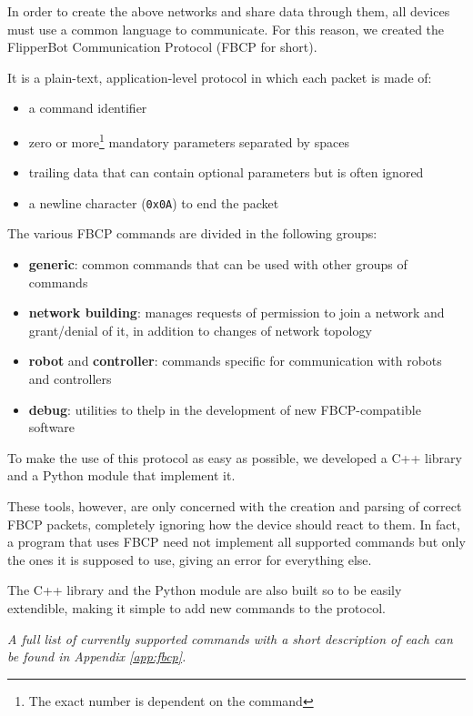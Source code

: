 In order to create the above networks and share data through them,
all devices must use a common language to communicate.
For this reason, we created the FlipperBot Communication Protocol
(FBCP for short).

It is a plain-text, application-level protocol in which each packet
is made of:
\begin{itemize}
  \item a command identifier
  \item zero or more\footnote{The exact number is dependent on the
    command} mandatory parameters separated by spaces
  \item trailing data that can contain optional parameters but is
    often ignored
  \item a newline character (\texttt{0x0A}) to end the packet
\end{itemize}

The various FBCP commands are divided in the following groups:
\begin{itemize}
  \item \textbf{generic}: common commands that can be used with
    other groups of commands
  \item \textbf{network building}: manages requests of permission to
    join a network and grant/denial of it, in addition to changes of
    network topology
  \item \textbf{robot} and \textbf{controller}: commands specific
    for communication with robots and controllers
  \item \textbf{debug}: utilities to thelp in the development of new
    FBCP-compatible software
\end{itemize}

To make the use of this protocol as easy as possible, we developed
a C++ library and a Python module that implement it.

These tools, however, are only concerned with the creation and
parsing of correct FBCP packets, completely ignoring how the device
should react to them. In fact, a program that uses FBCP need not
implement all supported commands but only the ones it is supposed to
use, giving an error for everything else.

The C++ library and the Python module are also built so to be easily
extendible, making it simple to add new commands to the protocol.

\textit{A full list of currently supported commands with a short
description of each can be found in Appendix \ref{app:fbcp}.}

